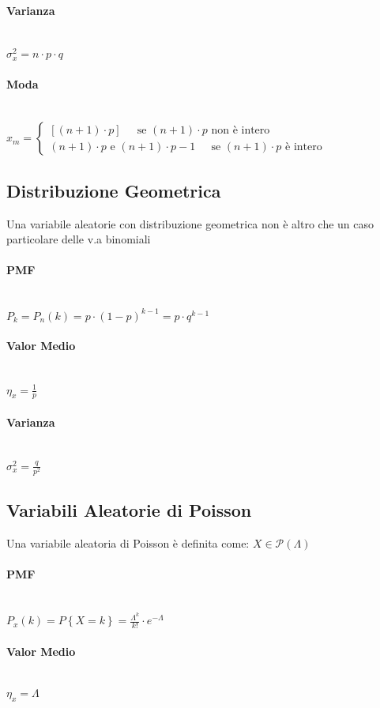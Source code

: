 \documentclass{article}
\begin{document}
\paragraph{Varianza} ~\\
$\sigma_x^2 = n \cdot p \cdot q$
\paragraph{Moda} ~\\
$x_m = \begin{cases}
\left[(n+1) \cdot p\right] \;\;\;\;\text{ se } (n+1)\cdot p \text{ non è intero} \\
(n+1) \cdot p \text{ e } (n+1)\cdot p -1 \;\;\;\;\text{ se } (n+1)\cdot p \text{ è intero}
\end{cases}$

\subsection{Distribuzione Geometrica}
Una variabile aleatorie con distribuzione geometrica non è altro che un caso particolare delle v.a binomiali
\paragraph{PMF} ~\\
$P_k = P_n(k) = p \cdot (1-p)^{k-1} = p \cdot q^{k-1}$
\paragraph{Valor Medio} ~\\
$\eta_x = \frac{1}{p}$
\paragraph{Varianza} ~\\
$\sigma_x^2 = \frac{q}{p^2}$

\subsection{Variabili Aleatorie di Poisson}
Una variabile aleatoria di Poisson è definita come: $X \in \mathcal{P}(\Lambda)$
\paragraph{PMF} ~\\
$P_x(k) = P \left\{X = k\right\} = \frac{\Lambda^k}{k!} \cdot e^{-\Lambda}$
\paragraph{Valor Medio} ~\\
$\eta_x = \Lambda $
\end{document}
